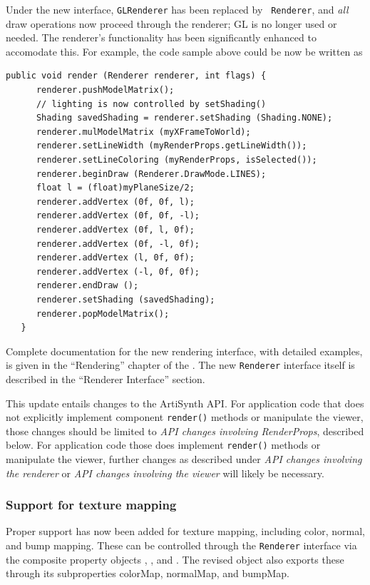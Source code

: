 \documentclass{article}
\begin{document}
Under the new interface, {\tt GLRenderer} has been replaced by {\tt
Renderer}, and {\it all} draw operations now proceed through the
renderer; GL is no longer used or needed. The renderer's 
functionality has been significantly enhanced to accomodate this.
For example, the code sample above could
be now be written as
%
\begin{lstlisting}[]
   public void render (Renderer renderer, int flags) {
      renderer.pushModelMatrix();
      // lighting is now controlled by setShading()
      Shading savedShading = renderer.setShading (Shading.NONE);
      renderer.mulModelMatrix (myXFrameToWorld);
      renderer.setLineWidth (myRenderProps.getLineWidth());
      renderer.setLineColoring (myRenderProps, isSelected());
      renderer.beginDraw (Renderer.DrawMode.LINES);
      float l = (float)myPlaneSize/2;
      renderer.addVertex (0f, 0f, l);
      renderer.addVertex (0f, 0f, -l);
      renderer.addVertex (0f, l, 0f);
      renderer.addVertex (0f, -l, 0f);
      renderer.addVertex (l, 0f, 0f);
      renderer.addVertex (-l, 0f, 0f);
      renderer.endDraw ();
      renderer.setShading (savedShading);
      renderer.popModelMatrix();
   }
\end{lstlisting}
%

Complete documentation for the new rendering interface, with detailed
examples, is given in the ``Rendering'' chapter of the
. 
The new {\tt Renderer} interface itself is
described in the ``Renderer Interface'' section.

This update entails changes to the ArtiSynth API. For application code
that does not explicitly implement component {\tt render()} methods or
manipulate the viewer, those changes should be limited to {\it API
changes involving RenderProps}, described below.  For application code
those does implement {\tt render()} methods or manipulate the viewer,
further changes as described under {\it API changes involving the
renderer} or {\it API changes involving the viewer} will likely be
necessary.

\subsubsection*{Support for texture mapping}

Proper support has now been added for texture mapping, including
color, normal, and bump mapping. These can be controlled through the
{\tt Renderer} interface via the composite property objects
,
, and
.  The revised
 object also exports these
through its subproperties {\sf colorMap}, {\sf normalMap}, and {\sf bumpMap}.
\end{document}
